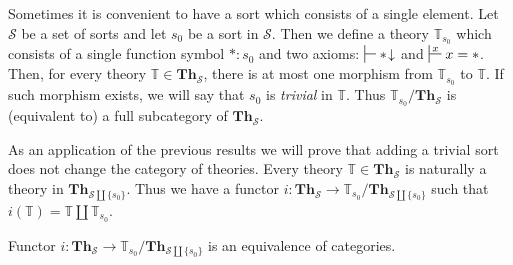 \documentclass[reqno]{amsart}
\theoremstyle{definition}
\theoremstyle{remark}
\newcommand{\cat}[1]{\mathbf{#1}}
\newcommand{\Th}{\cat{Th}}
\newcommand{\emptyCtx}{*}
\numberwithin{figure}{section}
\begin{document}
Sometimes it is convenient to have a sort which consists of a single element.
Let $\mathcal{S}$ be a set of sorts and let $s_0$ be a sort in $\mathcal{S}$.
Then we define a theory $\mathbb{T}_{s_0}$ which consists of a single function symbol $\emptyCtx : s_0$
    and two axioms: $\sststile{}{} \emptyCtx\!\downarrow$ and $\sststile{}{x} x = \emptyCtx$.
Then, for every theory $\mathbb{T} \in \Th_\mathcal{S}$, there is at most one morphism from $\mathbb{T}_{s_0}$ to $\mathbb{T}$.
If such morphism exists, we will say that $s_0$ is \emph{trivial} in $\mathbb{T}$.
Thus $\mathbb{T}_{s_0}/\Th_\mathcal{S}$ is (equivalent to) a full subcategory of $\Th_\mathcal{S}$.

As an application of the previous results we will prove that adding a trivial sort does not change the category of theories.
Every theory $\mathbb{T} \in \Th_\mathcal{S}$ is naturally a theory in $\Th_{\mathcal{S} \amalg \{ s_0 \}}$.
Thus we have a functor $i : \Th_\mathcal{S} \to \mathbb{T}_{s_0}/\Th_{\mathcal{S} \amalg \{ s_0 \}}$ such that $i(\mathbb{T}) = \mathbb{T} \amalg \mathbb{T}_{s_0}$.
\begin{prop}
Functor $i : \Th_\mathcal{S} \to \mathbb{T}_{s_0}/\Th_{\mathcal{S} \amalg \{ s_0 \}}$ is an equivalence of categories.
\end{prop}
\end{document}
